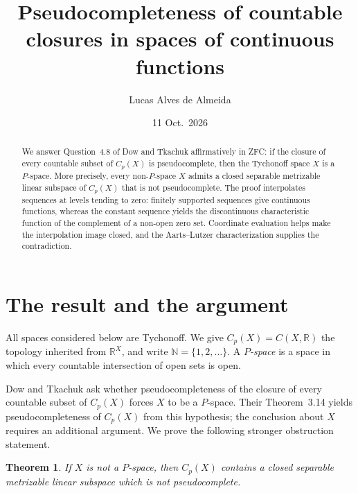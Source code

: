 \documentclass{amsart}
\newtheorem{theorem}{Theorem}[section]
\theoremstyle{remark}
\newcommand{\R}{\mathbb{R}}
\newcommand{\N}{\mathbb{N}}
\begin{document}
\title[Pseudocompleteness of countable closures]{Pseudocompleteness of countable closures in spaces of continuous functions}

\author{Lucas Alves de Almeida}

\date{11 Oct.\ 2026}



\begin{abstract}
We answer Question~4.8 of Dow and Tkachuk affirmatively in ZFC: if the closure of every countable subset of $C_p(X)$ is pseudocomplete, then the Tychonoff space $X$ is a $P$-space. More precisely, every non-$P$-space $X$ admits a closed separable metrizable linear subspace of $C_p(X)$ that is not pseudocomplete. The proof interpolates sequences at levels tending to zero: finitely supported sequences give continuous functions, whereas the constant sequence yields the discontinuous characteristic function of the complement of a non-open zero set. Coordinate evaluation helps make the interpolation image closed, and the Aarts--Lutzer characterization supplies the contradiction.
\end{abstract}

\maketitle

\section{The result and the argument}

All spaces considered below are Tychonoff. We give $C_p(X)=C(X,\R)$ the topology inherited from $\R^X$, and write $\N=\{1,2,\ldots\}$. A \emph{$P$-space} is a space in which every countable intersection of open sets is open.

Dow and Tkachuk \cite[Question~4.8]{DT} ask whether pseudocompleteness of the closure of every countable subset of $C_p(X)$ forces $X$ to be a $P$-space. Their Theorem~3.14 yields pseudocompleteness of $C_p(X)$ from this hypothesis; the conclusion about $X$ requires an additional argument. We prove the following stronger obstruction statement.

\begin{theorem}\label{thm:main}
If $X$ is not a $P$-space, then $C_p(X)$ contains a closed separable metrizable linear subspace which is not pseudocomplete.
\end{theorem}
\end{document}
